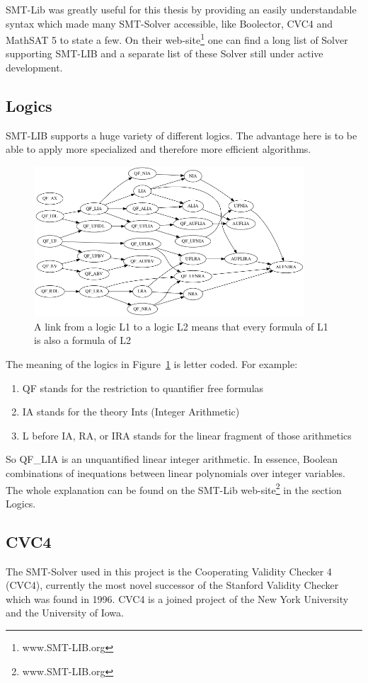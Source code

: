 SMT-Lib was greatly useful for this thesis by providing an easily understandable syntax which made many SMT-Solver accessible, like Boolector, CVC4 and MathSAT 5 to state a few. On their web-site\footnote{www.SMT-LIB.org} one can find a long list of Solver supporting SMT-LIB and a separate list of these Solver still under active development.

\subsection{Logics}
SMT-LIB supports a huge variety of different logics. The advantage here is to be able to apply more specialized and therefore more efficient algorithms.
\begin{figure}
  \centering
  \includegraphics[width=0.9\textwidth]{Pictures/logics.png}  
  \caption{A link from a logic L1 to a logic L2 means that every formula of L1 is also a formula of L2}
  \label{fig:logics}
\end{figure}
The meaning of the logics in Figure~\ref{fig:logics} is letter coded. For example:
\begin{enumerate}
  \item QF stands for the restriction to quantifier free formulas
  \item IA stands for the theory Ints (Integer Arithmetic)
  \item L before IA, RA, or IRA stands for the linear fragment of those arithmetics 
\end{enumerate}
So QF\_LIA is an unquantified linear integer arithmetic. In essence, Boolean combinations of inequations between linear polynomials over integer variables.
The whole explanation can be found on the SMT-Lib web-site\footnote{www.SMT-LIB.org} in the section Logics.

\subsection{CVC4}
The SMT-Solver used in this project is the Cooperating Validity Checker 4 (CVC4), currently the most novel  successor of the Stanford Validity Checker which was found in 1996. CVC4 is a joined project of the New York University and the University of Iowa.

